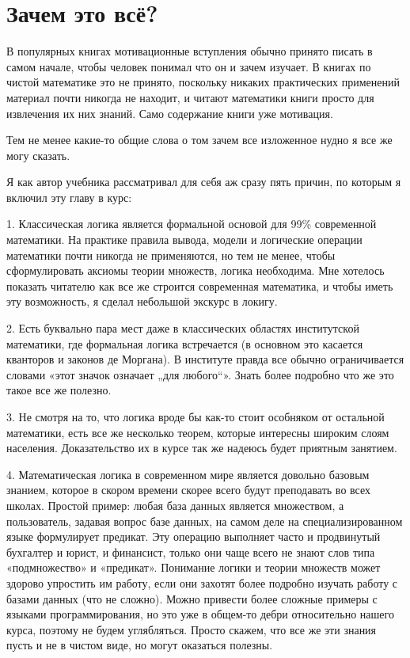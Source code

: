 \section{Зачем это всё?}

В популярных книгах мотивационные вступления обычно принято писать в самом начале, чтобы человек понимал что он и зачем изучает. В книгах по чистой математике это не принято, поскольку никаких практических применений материал почти никогда не находит, и читают математики книги просто для извлечения их них знаний. Само содержание книги уже мотивация.

Тем не менее какие-то общие слова о том зачем все изложенное нудно я все же могу сказать.

Я как автор учебника рассматривал для себя аж сразу пять причин, по которым я включил эту главу в курс:

1. Классическая логика является формальной основой для 99\% современной математики. На практике правила вывода, модели и логические операции математики почти никогда не применяются, но тем не менее, чтобы сформулировать аксиомы теории множеств, логика необходима. Мне хотелось показать читателю как все же строится современная математика, и чтобы иметь эту возможность, я сделал небольшой экскурс в локигу.

2. Есть буквально пара мест даже в классических областях институтской математики, где формальная логика встречается (в основном это касается кванторов и законов де Моргана). В институте правда все обычно ограничивается словами «этот значок означает „для любого“». Знать более подробно что же это такое все же полезно.

3. Не смотря на то, что логика вроде бы как-то стоит особняком от остальной математики, есть все же несколько теорем, которые интересны широким слоям населения. Доказательство их в курсе так же надеюсь будет приятным занятием.

4. Математическая логика в современном мире является довольно базовым знанием, которое в скором времени скорее всего будут преподавать во всех школах. Простой пример: любая база данных является множеством, а пользователь, задавая вопрос базе данных, на самом деле на специализированном языке формулирует предикат. Эту операцию выполняет часто и продвинутый бухгалтер и юрист, и финансист, только они чаще всего не знают слов типа «подмножество» и «предикат». Понимание логики и теории множеств может здорово упростить им работу, если они захотят более подробно изучать работу с базами данных (что не сложно). Можно привести более сложные примеры с языками программирования, но это уже в общем-то дебри относительно нашего курса, поэтому не будем углябляться. Просто скажем, что все же эти знания пусть и не в чистом виде, но могут оказаться полезны.

